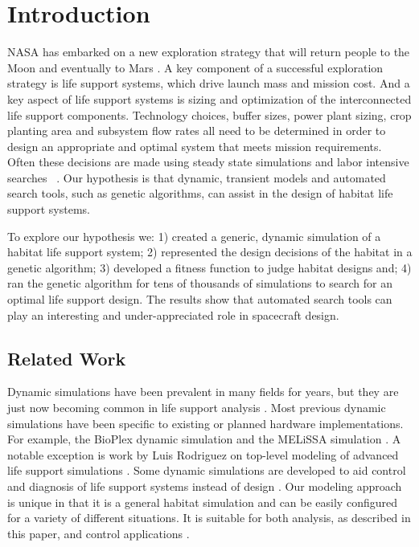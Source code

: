 \documentclass[submit]{aiaa}
\begin{document}
\section{Introduction}

NASA has embarked on a new exploration strategy that will return
people to the Moon and eventually to Mars \cite{nasa_es04}.  A key
component of a successful exploration strategy is life support
systems, which drive launch mass and mission cost.  And a key aspect
of life support systems is sizing and optimization of the
interconnected life support components.  Technology choices, buffer
sizes, power plant sizing, crop planting area and subsystem flow rates
all need to be determined in order to design an appropriate and
optimal system that meets mission requirements.  Often these decisions
are made using steady state simulations and labor intensive searches~ \cite{yeh_etal04}.  Our hypothesis is
that dynamic, transient models and automated search tools, such as
genetic algorithms, can assist in the design of habitat life support
systems.

To explore our hypothesis we: 1) created a generic, dynamic simulation
of a habitat life support system; 2) represented the design decisions
of the habitat in a genetic algorithm; 3) developed a fitness function
to judge habitat designs and; 4) ran the genetic algorithm for tens of
thousands of simulations to search for an optimal life support
design.  The results show that automated search tools can play an
interesting and under-appreciated role in spacecraft design.  

\subsection{Related Work}

Dynamic simulations have been prevalent in many fields for years, but
they are just now becoming common in life support analysis
\cite{jones02}.  Most previous dynamic simulations have been specific
to existing or planned hardware implementations.  For example, the
BioPlex dynamic simulation \cite{finn98} and the MELiSSA simulation
\cite{ordonez_etal04}.  A notable exception is work by Luis Rodriguez
on top-level modeling of advanced life support simulations
\cite{rodriguez_etal00}.  Some dynamic simulations are developed to
aid control and diagnosis of life support systems instead of design
\cite{biswas_etal04}.  Our modeling approach is unique in that it is a
general habitat simulation and can be easily configured for a variety
of different situations.  It is suitable for both analysis, as
described in this paper, and control
applications \cite{klien_etal04}. 
\end{document}
